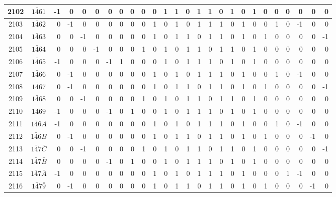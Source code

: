 \documentclass[12 pt]{article}%
\begin{document}
\begin{tiny}
\begin{centering}
\begin{longtable}{|c|c||rrrrrrrrrrrrrrrrrrrrrrrr|}
      \hline
      2102 & $1\bar461$ & -1 & 0 & 0 & 0 & 0 & 0 & 0 & 0 & 0 & 1 & 1 & 0 & 1 & 1 & 0 & 1 & 0 & 1 & 0 & 0 & 0 & 0 & 0 & 0 \\
      \hline
      2103 & $1\bar462$ & 0 & -1 & 0 & 0 & 0 & 0 & 0 & 0 & 1 & 0 & 1 & 0 & 1 & 1 & 1 & 0 & 1 & 0 & 0 & 1 & 0 & -1 & 0 & 0 \\
      \hline
      2104 & $1\bar463$ & 0 & 0 & -1 & 0 & 0 & 0 & 0 & 0 & 1 & 0 & 1 & 1 & 0 & 1 & 1 & 0 & 1 & 0 & 1 & 0 & 0 & 0 & 0 & -1 \\
      \hline
      2105 & $1\bar464$ & 0 & 0 & 0 & -1 & 0 & 0 & 0 & 1 & 0 & 1 & 0 & 1 & 1 & 0 & 1 & 1 & 0 & 1 & 0 & 0 & 0 & 0 & 0 & 0 \\
      \hline
      2106 & $1\bar465$ & -1 & 0 & 0 & 0 & -1 & 1 & 0 & 0 & 0 & 1 & 0 & 1 & 1 & 1 & 0 & 1 & 0 & 1 & 0 & 0 & 0 & 0 & 0 & 0 \\
      \hline
      2107 & $1\bar466$ & 0 & -1 & 0 & 0 & 0 & 0 & 0 & 0 & 1 & 0 & 1 & 0 & 1 & 1 & 1 & 0 & 1 & 0 & 0 & 1 & 0 & -1 & 0 & 0 \\
      \hline
      2108 & $1\bar467$ & 0 & -1 & 0 & 0 & 0 & 0 & 0 & 0 & 1 & 0 & 1 & 1 & 0 & 1 & 1 & 0 & 1 & 0 & 1 & 0 & 0 & 0 & 0 & -1 \\
      \hline
      2109 & $1\bar468$ & 0 & 0 & -1 & 0 & 0 & 0 & 0 & 1 & 0 & 1 & 0 & 1 & 1 & 0 & 1 & 1 & 0 & 1 & 0 & 0 & 0 & 0 & 0 & 0 \\
      \hline
      2110 & $1\bar469$ & -1 & 0 & 0 & 0 & -1 & 0 & 1 & 0 & 0 & 1 & 0 & 1 & 1 & 1 & 0 & 1 & 0 & 1 & 0 & 0 & 0 & 0 & 0 & 0 \\
      \hline
      2111 & $1\bar46A$ & -1 & 0 & 0 & 0 & 0 & 0 & 0 & 0 & 1 & 0 & 1 & 0 & 1 & 1 & 1 & 0 & 1 & 0 & 0 & 1 & 0 & -1 & 0 & 0 \\
      \hline
      2112 & $1\bar46B$ & 0 & -1 & 0 & 0 & 0 & 0 & 0 & 0 & 1 & 0 & 1 & 1 & 0 & 1 & 1 & 0 & 1 & 0 & 1 & 0 & 0 & 0 & -1 & 0 \\
      \hline
      2113 & $1\bar47\bar C$ & 0 & 0 & -1 & 0 & 0 & 0 & 0 & 1 & 0 & 1 & 0 & 1 & 1 & 0 & 1 & 1 & 0 & 1 & 0 & 0 & 0 & 0 & 0 & -1 \\
      \hline
      2114 & $1\bar47\bar B$ & 0 & 0 & 0 & 0 & -1 & 0 & 1 & 0 & 0 & 1 & 0 & 1 & 1 & 1 & 0 & 1 & 0 & 1 & 0 & 0 & 0 & 0 & 0 & 0 \\
      \hline
      2115 & $1\bar47\bar A$ & -1 & 0 & 0 & 0 & 0 & 0 & 0 & 0 & 1 & 0 & 1 & 0 & 1 & 1 & 1 & 0 & 1 & 0 & 0 & 0 & 1 & -1 & 0 & 0 \\
      \hline
      2116 & $1\bar47\bar9$ & 0 & -1 & 0 & 0 & 0 & 0 & 0 & 0 & 1 & 0 & 1 & 1 & 0 & 1 & 1 & 0 & 1 & 0 & 1 & 0 & 0 & 0 & -1 & 0 \\

\end{longtable}
\end{centering}
\end{tiny}
\end{document}
